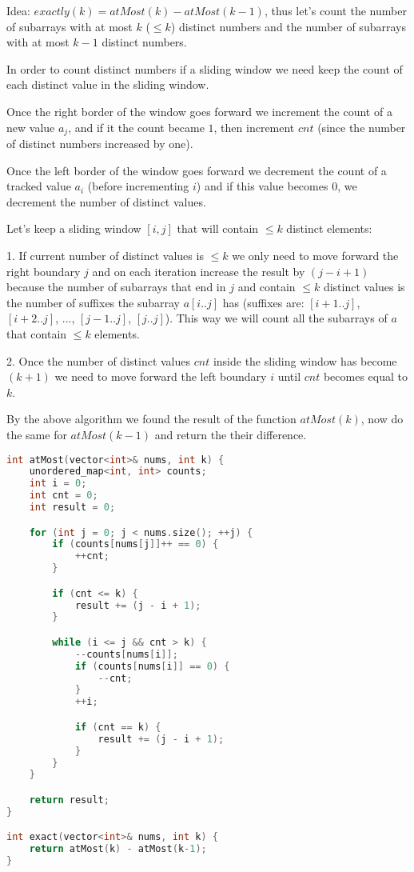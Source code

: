 \begin{solution}

Idea: $exactly(k) = atMost(k) - atMost(k-1)$, thus let's count the number of subarrays with at most $k$ ($\leq k$) distinct numbers and the number of subarrays with at most $k-1$ distinct numbers.

In order to count distinct numbers if a sliding window we need keep the count of each distinct value in the sliding window.

Once the right border of the window goes forward we increment the count of a new value $a_j$, and if it the count became $1$, then increment $cnt$ (since the number of distinct numbers increased by one).

Once the left border of the window goes forward we decrement the count of a tracked value $a_i$ (before incrementing $i$) and if this value becomes $0$, we decrement the number of distinct values.

Let's keep a sliding window $[i, j]$ that will contain $\leq k$ distinct elements:

1. If current number of distinct values is $\leq k$ we only need to move forward the right boundary $j$ and on each iteration increase the result by $(j - i + 1)$ because the number of subarrays that end in $j$ and contain $\leq k$ distinct values is the number of suffixes the subarray $a[i..j]$ has (suffixes are: $[i+1..j]$, $[i+2..j]$, ..., $[j-1..j]$, $[j..j]$). This way we will count all the subarrays of $a$ that contain $\leq k$ elements.

2. Once the number of distinct values $cnt$ inside the sliding window has become $(k+1)$ we need to move forward the left boundary $i$ until $cnt$ becomes equal to $k$.

By the above algorithm we found the result of the function $atMost(k)$, now do the same for $atMost(k-1)$ and return the their difference.


\begin{lstlisting}[language=C++]
int atMost(vector<int>& nums, int k) {
    unordered_map<int, int> counts;
    int i = 0;
    int cnt = 0;
    int result = 0;

    for (int j = 0; j < nums.size(); ++j) {
        if (counts[nums[j]]++ == 0) {
            ++cnt;
        }

        if (cnt <= k) {
            result += (j - i + 1);
        }

        while (i <= j && cnt > k) {
            --counts[nums[i]];
            if (counts[nums[i]] == 0) {
                --cnt;
            }
            ++i;

            if (cnt == k) {
                result += (j - i + 1);
            }
        }
    }

    return result;
}

int exact(vector<int>& nums, int k) {
    return atMost(k) - atMost(k-1);
}
\end{lstlisting}

\end{solution}